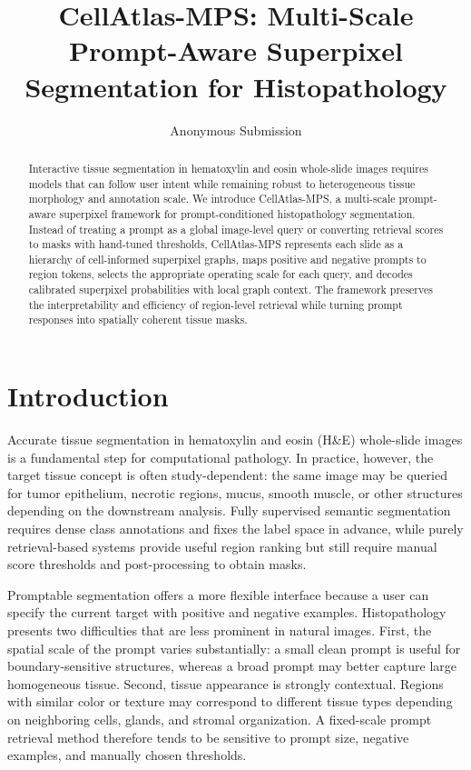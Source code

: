 \documentclass[letterpaper]{article} %
\title{CellAtlas-MPS: Multi-Scale Prompt-Aware Superpixel Segmentation for Histopathology}
\author{Anonymous Submission}
\begin{document}
\maketitle

\begin{abstract}
Interactive tissue segmentation in hematoxylin and eosin whole-slide images requires models that can follow user intent while remaining robust to heterogeneous tissue morphology and annotation scale. We introduce CellAtlas-MPS, a multi-scale prompt-aware superpixel framework for prompt-conditioned histopathology segmentation. Instead of treating a prompt as a global image-level query or converting retrieval scores to masks with hand-tuned thresholds, CellAtlas-MPS represents each slide as a hierarchy of cell-informed superpixel graphs, maps positive and negative prompts to region tokens, selects the appropriate operating scale for each query, and decodes calibrated superpixel probabilities with local graph context. The framework preserves the interpretability and efficiency of region-level retrieval while turning prompt responses into spatially coherent tissue masks.
\end{abstract}

\section{Introduction}

Accurate tissue segmentation in hematoxylin and eosin (H\&E) whole-slide images is a fundamental step for computational pathology. In practice, however, the target tissue concept is often study-dependent: the same image may be queried for tumor epithelium, necrotic regions, mucus, smooth muscle, or other structures depending on the downstream analysis. Fully supervised semantic segmentation requires dense class annotations and fixes the label space in advance, while purely retrieval-based systems provide useful region ranking but still require manual score thresholds and post-processing to obtain masks.

Promptable segmentation offers a more flexible interface because a user can specify the current target with positive and negative examples. Histopathology presents two difficulties that are less prominent in natural images. First, the spatial scale of the prompt varies substantially: a small clean prompt is useful for boundary-sensitive structures, whereas a broad prompt may better capture large homogeneous tissue. Second, tissue appearance is strongly contextual. Regions with similar color or texture may correspond to different tissue types depending on neighboring cells, glands, and stromal organization. A fixed-scale prompt retrieval method therefore tends to be sensitive to prompt size, negative examples, and manually chosen thresholds.
\end{document}
